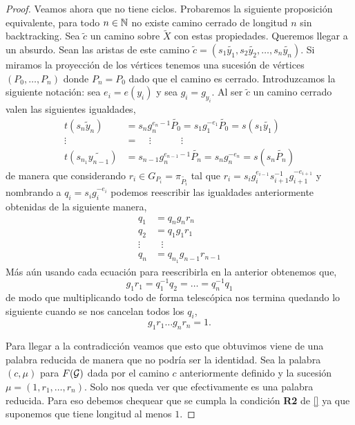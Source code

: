 \documentclass[tesis.tex]{subfiles}
\newcommand{\cG}{ {\cal G} }
\begin{document}
\begin{proof}
	Veamos ahora que no tiene ciclos.
	Probaremos la siguiente proposición equivalente, para todo $n \in \mathbb{N}$ no existe camino cerrado de longitud $n$ sin backtracking.
	Sea $\tilde c$ un camino sobre $\tilde X$ con estas propiedades. 
	Queremos llegar a un absurdo.
	Sean las aristas de este camino $\tilde c = (s_1\tilde{y_1}, s_2 \tilde{y_2}, \dots, s_n \tilde{ y_n})$.
	Si miramos la proyección de los vértices tenemos una sucesión de vértices $(P_0, \dots, P_n)$ donde $P_n = P_0$ dado que el camino es cerrado.
	Introduzcamos la siguiente notación: sea $e_i = e(y_i)$ y sea $g_i = g_{y_i}$.
	Al ser $\tilde c$ un camino cerrado valen las siguientes igualdades,
	\begin{align*}
		t(s_n\tilde y_n) &= s_ng_n^{e_n - 1}\tilde{P_0} = s_1g_1^{-e_1} \tilde{P_0} = s(s_1\tilde{ y_1}) \\ 
		\vdots \ \ \  &= \ \ \ \ \    \vdots\ \ \ \ \ \ \ \ \ \ \ \ \ \    \vdots \\
		t(s_{n_1}\widetilde{ y_{n-1}}) &= s_{n-1}g_n^{e_{n-1} - 1}\tilde{P_n} = s_ng_n^{-e_n} = s(s_n\tilde{P_n} )  
	\end{align*}
	de manera que considerando $r_i \in G_{P_i} = \pi_{\tilde{ P_i}}$ tal que $r_i = s_ig_i^{e_{i-1}} s_{i+1}^{-1} g_{i+1}^{-e_{i+1}}$ y nombrando a $q_i = s_ig_i^{-e_i}$ 
	podemos reescribir las igualdades anteriormente obtenidas de la siguiente manera,
	\begin{align*}
		q_1 &= q_ng_nr_n \\
		q_2 &= q_1g_1r_1 \\
		\vdots & \ \ \ \vdots \\
		q_n &= q_{n_1}g_{n-1}r_{n-1} 
	\end{align*}
	Más aún usando cada ecuación para reescribirla en la anterior obtenemos que,
	\begin{equation*}
		g_1r_1 = q_1^{-1} q_2 = \dots = q_n^{-1}q_1
	\end{equation*}
	de modo que multiplicando todo de forma telescópica nos termina quedando lo siguiente cuando se nos cancelan todos los $q_i$,
	\begin{equation*}
		g_1r_1\dots g_nr_n = 1.
	\end{equation*} 
	
	Para llegar a la contradicción veamos que esto que obtuvimos viene de una palabra reducida de manera que no podría ser la identidad.
	Sea la palabra $(c, \mu)$ para $F(\cG)$ dada por el camino $c$ anteriormente definido y la sucesión $\mu = (1,r_1, \dots, r_n)$.
	Solo nos queda ver que efectivamente es una palabra reducida. 
	Para eso debemos chequear que se cumpla la condición \textbf{R2} de \ref{} ya que suponemos que tiene longitud al menos $1$.
	

\end{proof}
\end{document}
